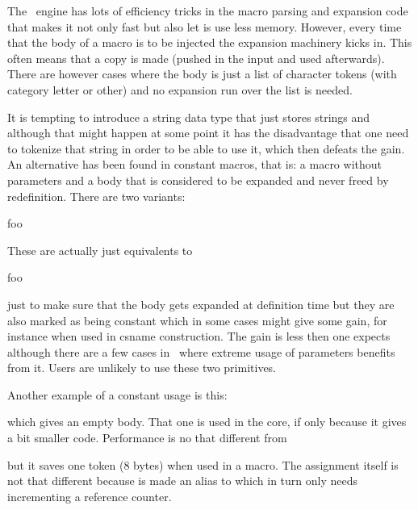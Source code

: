 \stopsectionlevel

\startsectionlevel[title=Constants]

The \LUAMETATEX\ engine has lots of efficiency tricks in the macro parsing and
expansion code that makes it not only fast but also let is use less memory.
However, every time that the body of a macro is to be injected the expansion
machinery kicks in. This often means that a copy is made (pushed in the input and
used afterwards). There are however cases where the body is just a list of
character tokens (with category letter or other) and no expansion run over the
list is needed.

It is tempting to introduce a string data type that just stores strings and
although that might happen at some point it has the disadvantage that one need to
tokenize that string in order to be able to use it, which then defeats the gain.
An alternative has been found in constant macros, that is: a macro without
parameters and a body that is considered to be expanded and never freed by
redefinition. There are two variants:

\starttyping[option=TEX]
\cdef      {}
\cdefcsname foo
\stoptyping

These are actually just equivalents to

\starttyping[option=TEX]
\edef      {}
\edefcsname foo
\stoptyping

just to make sure that the body gets expanded at definition time but they are
also marked as being constant which in some cases might give some gain, for
instance when used in csname construction. The gain is less then one expects
although there are a few cases in \CONTEXT\ where extreme usage of parameters
benefits from it. Users are unlikely to use these two primitives.

Another example of a constant usage is this:

\starttyping[option=TEX]
\foo
\stoptyping

which gives \type {\foo} an empty body. That one is used in the core, if only because
it gives a bit smaller code. Performance is no that different from

\starttyping[option=TEX]
\let\foo\empty
\stoptyping

but it saves one token (8 bytes) when used in a macro. The assignment itself is
not that different because \type {\foo} is made an alias to \type {\empty} which
in turn only needs incrementing a reference counter.


